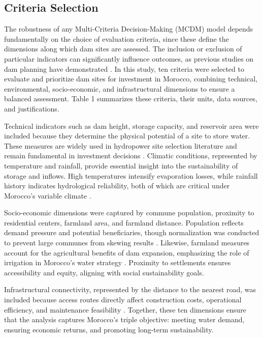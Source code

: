 \subsection{Criteria Selection}
The robustness of any Multi-Criteria Decision-Making (MCDM) model depends fundamentally on the choice of evaluation criteria, since these define the dimensions along which dam sites are assessed. The inclusion or exclusion of particular indicators can significantly influence outcomes, as previous studies on dam planning have demonstrated \cite{Roudgarmi2019}. In this study, ten criteria were selected to evaluate and prioritize dam sites for investment in Morocco, combining technical, environmental, socio-economic, and infrastructural dimensions to ensure a balanced assessment. Table 1 summarizes these criteria, their units, data sources, and justifications.

Technical indicators such as dam height, storage capacity, and reservoir area were included because they determine the physical potential of a site to store water. These measures are widely used in hydropower site selection literature and remain fundamental in investment decisions \cite{MOIZ2018309,Rana2020}. Climatic conditions, represented by temperature and rainfall, provide essential insight into the sustainability of storage and inflows. High temperatures intensify evaporation losses, while rainfall history indicates hydrological reliability, both of which are critical under Morocco’s variable climate \cite{Belokda2018}.

Socio-economic dimensions were captured by commune population, proximity to residential centers, farmland area, and farmland distance. Population reflects demand pressure and potential beneficiaries, though normalization was conducted to prevent large communes from skewing results \cite{Ersoy2022,Kosareva2018}. Likewise, farmland measures account for the agricultural benefits of dam expansion, emphasizing the role of irrigation in Morocco’s water strategy \cite{Ghumman2020}. Proximity to settlements ensures accessibility and equity, aligning with social sustainability goals.

Infrastructural connectivity, represented by the distance to the nearest road, was included because access routes directly affect construction costs, operational efficiency, and maintenance feasibility \cite{YI2010852}. Together, these ten dimensions ensure that the analysis captures Morocco’s triple objective: meeting water demand, ensuring economic returns, and promoting long-term sustainability.

